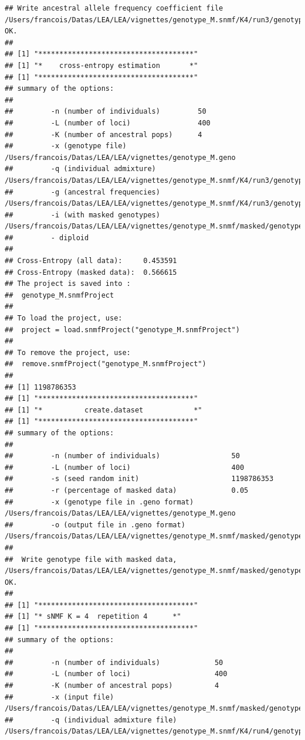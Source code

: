 \documentclass[12pt,a4paper,oneside]{article}\usepackage[]{graphicx}\usepackage[]{color}
\makeatletter
\newenvironment{kframe}{%
 \def\at@end@of@kframe{}%
 \ifinner\ifhmode%
  \def\at@end@of@kframe{\end{minipage}}%
  \begin{minipage}{\columnwidth}%
 \fi\fi%
 \def\FrameCommand##1{\hskip\@totalleftmargin \hskip-\fboxsep
 \colorbox{shadecolor}{##1}\hskip-\fboxsep
     \hskip-\linewidth \hskip-\@totalleftmargin \hskip\columnwidth}%
 \MakeFramed {\advance\hsize-\width
   \@totalleftmargin\z@ \linewidth\hsize
   \@setminipage}}%
 {\par\unskip\endMakeFramed%
 \at@end@of@kframe}
\newenvironment{knitrout}{}{} %
\makeatother
\begin{document}
\begin{knitrout}
\begin{kframe}
\begin{verbatim}
## Write ancestral allele frequency coefficient file /Users/francois/Datas/LEA/LEA/vignettes/genotype_M.snmf/K4/run3/genotype_M_r3.4.G:	OK.
## 
## [1] "*************************************"
## [1] "*    cross-entropy estimation       *"
## [1] "*************************************"
## summary of the options:
## 
##         -n (number of individuals)         50
##         -L (number of loci)                400
##         -K (number of ancestral pops)      4
##         -x (genotype file)                 /Users/francois/Datas/LEA/LEA/vignettes/genotype_M.geno
##         -q (individual admixture)          /Users/francois/Datas/LEA/LEA/vignettes/genotype_M.snmf/K4/run3/genotype_M_r3.4.Q
##         -g (ancestral frequencies)         /Users/francois/Datas/LEA/LEA/vignettes/genotype_M.snmf/K4/run3/genotype_M_r3.4.G
##         -i (with masked genotypes)         /Users/francois/Datas/LEA/LEA/vignettes/genotype_M.snmf/masked/genotype_M_I.geno
##         - diploid
## 
## Cross-Entropy (all data):	 0.453591
## Cross-Entropy (masked data):	 0.566615
## The project is saved into :
##  genotype_M.snmfProject 
## 
## To load the project, use:
##  project = load.snmfProject("genotype_M.snmfProject")
## 
## To remove the project, use:
##  remove.snmfProject("genotype_M.snmfProject")
## 
## [1] 1198786353
## [1] "*************************************"
## [1] "*          create.dataset            *"
## [1] "*************************************"
## summary of the options:
## 
##         -n (number of individuals)                 50
##         -L (number of loci)                        400
##         -s (seed random init)                      1198786353
##         -r (percentage of masked data)             0.05
##         -x (genotype file in .geno format)         /Users/francois/Datas/LEA/LEA/vignettes/genotype_M.geno
##         -o (output file in .geno format)           /Users/francois/Datas/LEA/LEA/vignettes/genotype_M.snmf/masked/genotype_M_I.geno
## 
##  Write genotype file with masked data, /Users/francois/Datas/LEA/LEA/vignettes/genotype_M.snmf/masked/genotype_M_I.geno:		OK.
## 
## [1] "*************************************"
## [1] "* sNMF K = 4  repetition 4      *"
## [1] "*************************************"
## summary of the options:
## 
##         -n (number of individuals)             50
##         -L (number of loci)                    400
##         -K (number of ancestral pops)          4
##         -x (input file)                        /Users/francois/Datas/LEA/LEA/vignettes/genotype_M.snmf/masked/genotype_M_I.geno
##         -q (individual admixture file)         /Users/francois/Datas/LEA/LEA/vignettes/genotype_M.snmf/K4/run4/genotype_M_r4.4.Q

\end{verbatim}
\end{kframe}
\end{knitrout}
\end{document}
